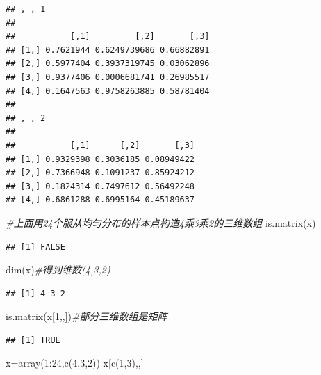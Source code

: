 \documentclass[
]{book}
\newenvironment{Shaded}{\begin{snugshade}}{\end{snugshade}}
\newcommand{\CommentTok}[1]{\textcolor[rgb]{0.56,0.35,0.01}{\textit{#1}}}
\newcommand{\DecValTok}[1]{\textcolor[rgb]{0.00,0.00,0.81}{#1}}
\newcommand{\FunctionTok}[1]{\textcolor[rgb]{0.00,0.00,0.00}{#1}}
\newcommand{\NormalTok}[1]{#1}
\newcommand{\OtherTok}[1]{\textcolor[rgb]{0.56,0.35,0.01}{#1}}
\newcommand{\SpecialCharTok}[1]{\textcolor[rgb]{0.00,0.00,0.00}{#1}}
\begin{document}
\begin{verbatim}
## , , 1
## 
##           [,1]         [,2]       [,3]
## [1,] 0.7621944 0.6249739686 0.66882891
## [2,] 0.5977404 0.3937319745 0.03062896
## [3,] 0.9377406 0.0006681741 0.26985517
## [4,] 0.1647563 0.9758263885 0.58781404
## 
## , , 2
## 
##           [,1]      [,2]       [,3]
## [1,] 0.9329398 0.3036185 0.08949422
## [2,] 0.7366948 0.1091237 0.85924212
## [3,] 0.1824314 0.7497612 0.56492248
## [4,] 0.6861288 0.6995164 0.45189637
\end{verbatim}

\begin{Shaded}
\begin{Highlighting}[]
\CommentTok{\#上面用24个服从均匀分布的样本点构造4乘3乘2的三维数组}
\FunctionTok{is.matrix}\NormalTok{(x)}
\end{Highlighting}
\end{Shaded}

\begin{verbatim}
## [1] FALSE
\end{verbatim}

\begin{Shaded}
\begin{Highlighting}[]
\FunctionTok{dim}\NormalTok{(x)}\CommentTok{\#得到维数(4,3,2)}
\end{Highlighting}
\end{Shaded}

\begin{verbatim}
## [1] 4 3 2
\end{verbatim}

\begin{Shaded}
\begin{Highlighting}[]
\FunctionTok{is.matrix}\NormalTok{(x[}\DecValTok{1}\NormalTok{,,])}\CommentTok{\#部分三维数组是矩阵}
\end{Highlighting}
\end{Shaded}

\begin{verbatim}
## [1] TRUE
\end{verbatim}

\begin{Shaded}
\begin{Highlighting}[]
\NormalTok{x}\OtherTok{=}\FunctionTok{array}\NormalTok{(}\DecValTok{1}\SpecialCharTok{:}\DecValTok{24}\NormalTok{,}\FunctionTok{c}\NormalTok{(}\DecValTok{4}\NormalTok{,}\DecValTok{3}\NormalTok{,}\DecValTok{2}\NormalTok{))}
\NormalTok{x[}\FunctionTok{c}\NormalTok{(}\DecValTok{1}\NormalTok{,}\DecValTok{3}\NormalTok{),,]}
\end{Highlighting}
\end{Shaded}
\end{document}
